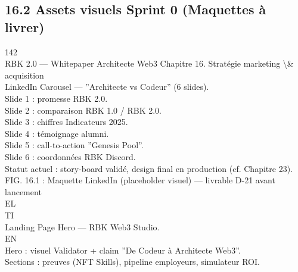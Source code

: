 \subsection{16.2 Assets visuels Sprint 0 (Maquettes à livrer)}
\vspace{0.5em}
\vspace{0.5em}
\vspace{0.5em}
\vspace{0.5em}
142\\
RBK 2.0 — Whitepaper Architecte Web3                                                            Chapitre 16. Stratégie marketing \textbackslash{}& acquisition\\
\vspace{0.5em}
\vspace{0.5em}
\vspace{0.5em}
\vspace{0.5em}
LinkedIn Carousel — ”Architecte vs Codeur” (6 slides).\\
Slide 1 : promesse RBK 2.0.\\
Slide 2 : comparaison RBK 1.0 / RBK 2.0.\\
Slide 3 : chiffres Indicateurs 2025.\\
Slide 4 : témoignage alumni.\\
Slide 5 : call-to-action ”Genesis Pool”.\\
Slide 6 : coordonnées RBK Discord.\\
Statut actuel : story-board validé, design final en production (cf. Chapitre 23).\\
\vspace{0.5em}
FIG. 16.1 : Maquette LinkedIn (placeholder visuel) — livrable D-21 avant lancement\\
\vspace{0.5em}
\vspace{0.5em}
\vspace{0.5em}
\vspace{0.5em}
EL\\
TI\\
Landing Page Hero — RBK Web3 Studio.\\
\vspace{0.5em}
\vspace{0.5em}
\vspace{0.5em}
\vspace{0.5em}
EN\\
Hero : visuel Validator + claim ”De Codeur à Architecte Web3”.\\
Sections : preuves (NFT Skills), pipeline employeurs, simulateur ROI.\\
